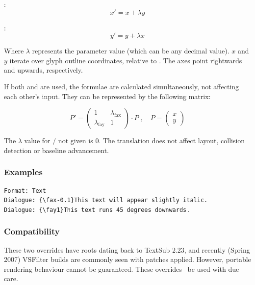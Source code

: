 \documentclass{spec}
\begin{document}
:
$$x' = x + \lambda y$$

:
$$y' = y + \lambda x$$

Where $\lambda$ represents the parameter value (which can be any decimal
value). $x$ and $y$ iterate over glyph outline coordinates, relative to
. The axes point rightwards and upwards, respectively.

If both  and  are used, the formulae are calculated
simultaneously, not affecting each other's input. They can be represented
by the following matrix:

$$P' = \begin{pmatrix}
1 & \lambda_{\text{fax}} \\
\lambda_{\text{fay}} & 1
\end{pmatrix} \cdot P\;, \quad P = \begin{pmatrix}x \\ y\end{pmatrix}$$

The $\lambda$ value for  /  not given is $0$. The translation
does not affect layout, collision detection or baseline advancement.

\subsubsection*{Examples}
\begin{verbatim}
Format: Text
Dialogue: {\fax-0.1}This text will appear slightly italic.
Dialogue: {\fay1}This text runs 45 degrees downwards.
\end{verbatim}

\subsubsection*{Compatibility}
These two overrides have roots dating back to TextSub 2.23, and
recently (Spring 2007) VSFilter builds are commonly seen with
patches applied. However, portable rendering behaviour cannot
be guaranteed. These overrides \may\ be used with due care.
\end{document}
